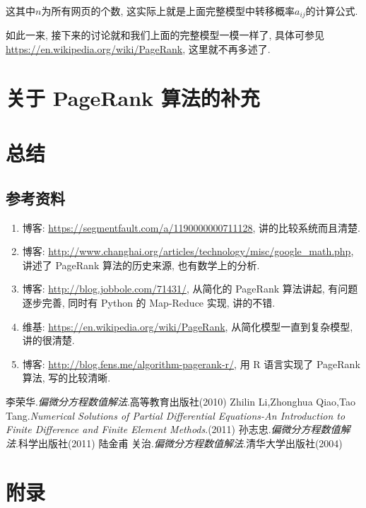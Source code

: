 \documentclass[a4paper,UTF8]{ctexart}
\theoremstyle{plain} \newtheorem{theorem}{定理}[section]
\theoremstyle{plain} \newtheorem{definition}{定义}[section]
\theoremstyle{plain} \newtheorem{lemma}{引理}[section]
\theoremstyle{plain} \newtheorem{proposition}{命题}[section]
\theoremstyle{plain} \newtheorem{example}{例}[section]
\theoremstyle{plain} \newtheorem{remark}{注}[section]
\theoremstyle{plain} \newtheorem{corollary}{推论}[section]
\begin{document}
这其中$n$为所有网页的个数, 这实际上就是上面完整模型中转移概率$a_{ij}$的计算公式. 

如此一来, 接下来的讨论就和我们上面的完整模型一模一样了, 具体可参见 \url{https://en.wikipedia.org/wiki/PageRank}, 这里就不再多述了.



\section{关于 PageRank 算法的补充}




\section{总结}
\subsection{参考资料}
\begin{enumerate}[(1)]
\item 博客: \url{https://segmentfault.com/a/1190000000711128}, 讲的比较系统而且清楚.

\item 博客: \url{http://www.changhai.org/articles/technology/misc/google_math.php}, 讲述了 PageRank 算法的历史来源, 也有数学上的分析.

\item 博客: \url{http://blog.jobbole.com/71431/}, 从简化的 PageRank 算法讲起, 有问题逐步完善, 同时有 Python 的 Map-Reduce 实现, 讲的不错.

\item 维基: \url{https://en.wikipedia.org/wiki/PageRank}, 从简化模型一直到复杂模型, 讲的很清楚.

\item 博客: \url{http://blog.fens.me/algorithm-pagerank-r/}, 用 R 语言实现了 PageRank 算法, 写的比较清晰.

\end{enumerate}


















\begin{thebibliography}{4}
   李荣华.\emph{偏微分方程数值解法}.高等教育出版社(2010) 
   Zhilin Li,Zhonghua Qiao,Tao Tang.\emph{Numerical Solutions of Partial Differential Equations-An Introduction to Finite Difference and Finite Element Methods}.(2011)
   孙志忠.\emph{偏微分方程数值解法}.科学出版社(2011)
   陆金甫 关治.\emph{偏微分方程数值解法}.清华大学出版社(2004)
  
\end{thebibliography}

\newpage

\section*{附录}
\end{document}
